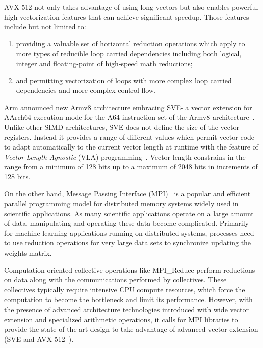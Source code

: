\documentclass[sigconf]{acmart}
\newcommand{\mpi}[0]{\textsc{MPI}\xspace}
\newcommand{\arm}[0]{Arm\xspace}
\newcommand{\sve}[0]{\textsc{SVE}\xspace}
\begin{document}
AVX-512 not only takes advantage of using long vectors but also enables powerful high
vectorization features that can achieve significant speedup. Those features
include but not limited to:
\begin{enumerate}
  \item providing a valuable set of horizontal reduction operations which apply to more
  types of reducible loop carried dependencies including both logical, integer
  and floating-point of high-speed math reductions;
  \item and permitting vectorization of loops with more complex loop carried dependencies and more complex control flow.
\end{enumerate}

\arm announced new Armv8 architecture embracing \sve - a vector extension for AArch64
execution mode for the A64 instruction set of the
Armv8 architecture~\cite{arm-v8-ref, ARMv8-Architecture}.
Unlike other SIMD architectures, \sve does not define the size of
the vector registers. Instead it provides a range of different values which permit vector
code to adapt automatically to the current vector length at runtime with the
feature of \emph{Vector Length Agnostic} (VLA) programming~\cite{Advanced-SIMD,vla-stencil}.
Vector length constrains in the range from a minimum of 128 bits up to
a maximum of 2048 bits in increments of 128 bits.

On the other hand, Message Passing Interface (\mpi)~\cite{mpi-forum} is a popular and efficient parallel
programming model for distributed memory systems widely used in scientific applications.
As many scientific applications operate on a large amount of data, manipulating and operating these data become complicated.
%
Primarily for machine learning applications running on distributed systems,
processes need to use reduction operations for very large data sets to
synchronize updating the weights matrix.

Computation-oriented collective operations like MPI\_Reduce perform reductions on
data along with the communications performed by collectives.
These collectives typically require intensive CPU compute resources, which force
the computation to become the bottleneck and limit its performance.
However, with the presence of advanced architecture technologies introduced
with wide vector extension and specialized arithmetic operations, it calls for
MPI libraries to provide the state-of-the-art design to take advantage of advanced vector
extension (\sve and AVX-512~\cite{avx-info, Cebrian2019}).
\end{document}
